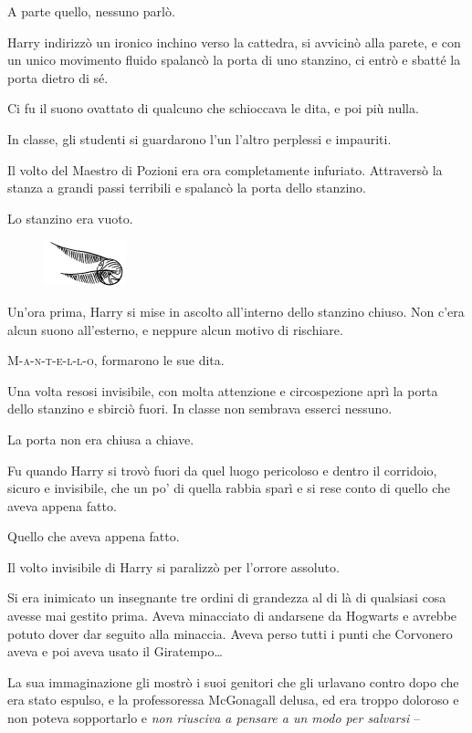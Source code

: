 A parte quello, nessuno parlò.

Harry indirizzò un ironico inchino verso la cattedra, si avvicinò alla parete, e con un unico movimento fluido spalancò la porta di uno stanzino, ci entrò e sbatté la porta dietro di sé.

Ci fu il suono ovattato di qualcuno che schioccava le dita, e poi più nulla.

In classe, gli studenti si guardarono l’un l’altro perplessi e impauriti.

Il volto del Maestro di Pozioni era ora completamente infuriato. Attraversò la stanza a grandi passi terribili e spalancò la porta dello stanzino.

Lo stanzino era vuoto.

\begin{figure}[h!]
        \includegraphics[scale=0.4]{boccino.png}
        \centering
\end{figure}

Un’ora prima, Harry si mise in ascolto all’interno dello stanzino chiuso. Non c’era alcun suono all’esterno, e neppure alcun motivo di rischiare.

\textsc{M-a-n-t-e-l-l-o}, formarono le sue dita.

Una volta resosi invisibile, con molta attenzione e circospezione aprì la porta dello stanzino e sbirciò fuori. In classe non sembrava esserci nessuno.

La porta non era chiusa a chiave.

Fu quando Harry si trovò fuori da quel luogo pericoloso e dentro il corridoio, sicuro e invisibile, che un po’ di quella rabbia sparì e si rese conto di quello che aveva appena fatto.

Quello che aveva appena fatto.

Il volto invisibile di Harry si paralizzò per l’orrore assoluto.

Si era inimicato un insegnante tre ordini di grandezza al di là di qualsiasi cosa avesse mai gestito prima. Aveva minacciato di andarsene da Hogwarts e avrebbe potuto dover dar seguito alla minaccia. Aveva perso tutti i punti che Corvonero aveva e poi aveva usato il Giratempo…

La sua immaginazione gli mostrò i suoi genitori che gli urlavano contro dopo che era stato espulso, e la professoressa McGonagall delusa, ed era troppo doloroso e non poteva sopportarlo e \textit{non riusciva a pensare a un modo per salvarsi} –

